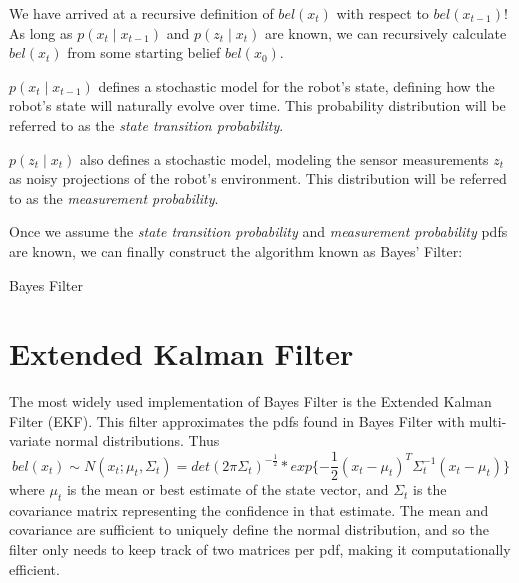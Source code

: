 We have arrived at a recursive definition of \(bel(x_t)\) with respect to \(bel(x_{t-1})\)! As long as \(p(x_t \mathbin{\vert} x_{t-1})\) and \(p(z_t \mathbin{\vert} x_t)\) are known, we can recursively calculate \(bel(x_t)\) from some starting belief \(bel(x_0)\).

\(p(x_t \mathbin{\vert} x_{t-1})\) defines a stochastic model for the robot's state, defining how the robot's state will naturally evolve over time. This probability distribution will be referred to as the \textit{state transition probability}. \cite{probabilisticRobotics}

\(p(z_t \mathbin{\vert} x_t)\) also defines a stochastic model, modeling the sensor measurements \(z_t\) as noisy projections of the robot's environment. This distribution will be referred to as the \textit{measurement probability}. \cite{probabilisticRobotics}

Once we assume the \textit{state transition probability} and \textit{measurement probability} pdfs are known, we can finally construct the algorithm known as Bayes' Filter:

\begin{algorithm} 
\caption{Bayes Filter} 
\label{alg:BayesFilter}
\begin{algorithmic}[1]
	\State {}
	\EndFunction
\end{algorithmic}
\end{algorithm}







\section{Extended Kalman Filter} \label{sectionEKF}

The most widely used implementation of Bayes Filter is the Extended Kalman Filter (EKF). This filter approximates the pdfs found in Bayes Filter with multi-variate normal distributions. Thus \[bel(x_t) \sim N(x_t; \mu_t,\Sigma_t) = det(2 \pi \Sigma_t)^{-\frac{1}{2}} * exp \{-\frac{1}{2} (x_t - \mu_t)^T \Sigma_t^{-1} (x_t - \mu_t) \}\] where \(\mu_t\) is the mean or best estimate of the state vector, and \(\Sigma_t\) is the covariance matrix representing the confidence in that estimate. The mean and covariance are sufficient to uniquely define the normal  distribution, and so the filter only needs to keep track of two matrices per pdf, making it computationally efficient.

